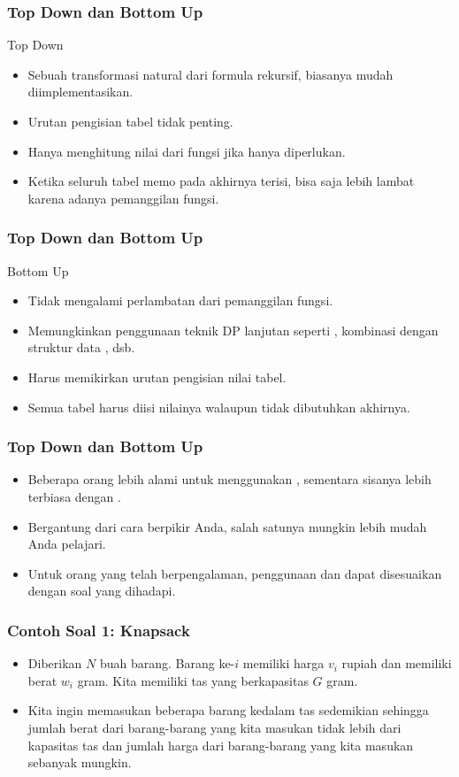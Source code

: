 \begin{frame}
\frametitle{Top Down dan Bottom Up}
Top Down
\begin{itemize}
  \item Sebuah transformasi natural dari formula rekursif, biasanya mudah diimplementasikan.
  \item Urutan pengisian tabel tidak penting.
  \item Hanya menghitung nilai dari fungsi jika hanya diperlukan.
  \item Ketika seluruh tabel memo pada akhirnya terisi, bisa saja lebih lambat karena adanya 
  \foverhead pemanggilan fungsi.
\end{itemize}
\end{frame}

\begin{frame}
\frametitle{Top Down dan Bottom Up}
Bottom Up
\begin{itemize}
  \item Tidak mengalami perlambatan dari \foverhead pemanggilan fungsi.
  \item Memungkinkan penggunaan teknik DP lanjutan seperti , kombinasi dengan struktur data , dsb.
  \item Harus memikirkan urutan pengisian nilai tabel.
  \item Semua tabel harus diisi nilainya walaupun tidak dibutuhkan akhirnya.
\end{itemize}
\end{frame}

\begin{frame}
\frametitle{Top Down dan Bottom Up}
\begin{itemize}
  \item Beberapa orang lebih alami untuk menggunakan \ftopdown, sementara sisanya lebih terbiasa dengan \fbottomup.
  \item Bergantung dari cara berpikir Anda, salah satunya mungkin lebih mudah Anda pelajari.
  \item Untuk orang yang telah berpengalaman, penggunaan \fbottomup dan \ftopdown dapat disesuaikan dengan soal yang dihadapi.
\end{itemize}
\end{frame}

\begin{frame} 
\frametitle{Contoh Soal 1: Knapsack}
\begin{itemize}
  \item Diberikan $N$ buah barang. Barang ke-$i$ memiliki harga $v_i$ rupiah dan memiliki berat $w_i$ gram. Kita memiliki tas yang berkapasitas $G$ gram. 
  \item Kita ingin memasukan beberapa barang kedalam tas sedemikian sehingga jumlah berat dari barang-barang yang kita masukan tidak lebih dari kapasitas tas dan jumlah harga dari barang-barang yang kita masukan sebanyak mungkin.
\end{itemize}
\end{frame}

